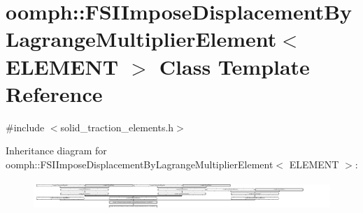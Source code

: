 \hypertarget{classoomph_1_1FSIImposeDisplacementByLagrangeMultiplierElement}{}\section{oomph\+:\+:F\+S\+I\+Impose\+Displacement\+By\+Lagrange\+Multiplier\+Element$<$ E\+L\+E\+M\+E\+NT $>$ Class Template Reference}
\label{classoomph_1_1FSIImposeDisplacementByLagrangeMultiplierElement}


{\ttfamily \#include $<$solid\+\_\+traction\+\_\+elements.\+h$>$}

Inheritance diagram for oomph\+:\+:F\+S\+I\+Impose\+Displacement\+By\+Lagrange\+Multiplier\+Element$<$ E\+L\+E\+M\+E\+NT $>$\+:\begin{figure}[H]
\begin{center}
\leavevmode
\includegraphics[height=1.113320cm]{classoomph_1_1FSIImposeDisplacementByLagrangeMultiplierElement}
\end{center}
\end{figure}
